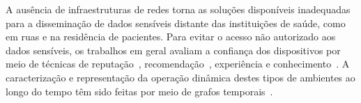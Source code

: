 \documentclass[12pt]{article}
\begin{document}
A ausência de infraestruturas de redes
torna as soluções disponíveis inadequadas para a disseminação de dados sensíveis distante das instituições de saúde, como em ruas e na residência de pacientes. Para evitar o acesso não autorizado aos dados sensíveis, os trabalhos em geral avaliam a confiança dos dispositivos por meio de técnicas de reputação~\cite{truong2017toward}, recomendação~\cite{al2017trust}, experiência e conhecimento~\cite{truong2017toward}.
A caracterização e representação da operação dinâmica destes tipos de ambientes ao longo do tempo têm sido feitas por meio de grafos temporais~\cite{nzeko2017time}. 
\end{document}
